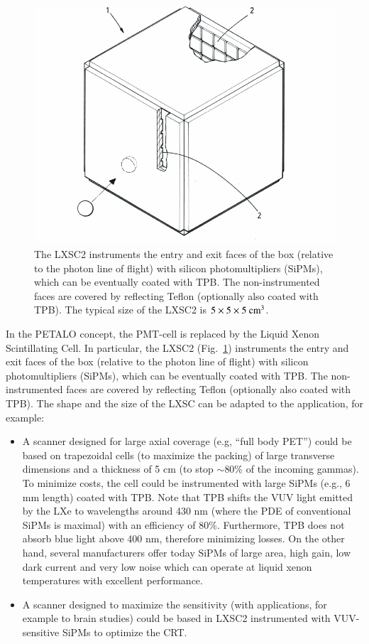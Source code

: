 \documentclass[review]{elsarticle}
\begin{document}
\begin{figure}[!htbp]
	\centering
	\includegraphics[scale=0.6]{../img/LXSC2.pdf}
	\caption{\label{fig.box} The LXSC2 instruments the entry and exit faces of the box (relative to the photon line of flight) with silicon photomultipliers (SiPMs), which can be eventually coated with TPB. The non-instrumented faces are covered by reflecting Teflon (optionally also coated with TPB). The typical size of the LXSC2
	is $5 \times 5 \times 5 {\rm ~cm^3}$.}
\end{figure}

In the PETALO concept, the PMT-cell is replaced by the Liquid Xenon Scintillating Cell. In particular, the LXSC2 
(Fig.~\ref{fig.box}) instruments the entry and exit faces of the box (relative to the photon line of flight) with silicon photomultipliers (SiPMs), which can be eventually coated with TPB. The non-instrumented faces are covered by reflecting Teflon (optionally also coated with TPB). The shape and the size of the LXSC can be adapted to the application, for example:
\begin{itemize}
\item A scanner designed for large axial coverage (e.g, ``full body PET'') could be based on trapezoidal cells (to maximize the packing) of large transverse dimensions and a thickness of 5 cm (to stop $\sim$80\% of the incoming gammas). To minimize costs, the cell could be instrumented with large
SiPMs (e.g., 6 mm length) coated with TPB.  Note that TPB shifts the VUV light emitted by the LXe  to wavelengths around 430 nm (where the PDE of conventional SiPMs is maximal) with an efficiency of 
80\%. Furthermore, TPB does not absorb blue light above 400 nm, therefore minimizing losses. On the other hand, several manufacturers offer today SiPMs of large area, high gain, low dark current and very low noise which can operate at liquid xenon temperatures with excellent performance.
\item A scanner designed to maximize the sensitivity (with applications, for example
to brain studies) could be based in LXSC2 instrumented with VUV-sensitive SiPMs to optimize the CRT. 
\end{itemize}
\end{document}
